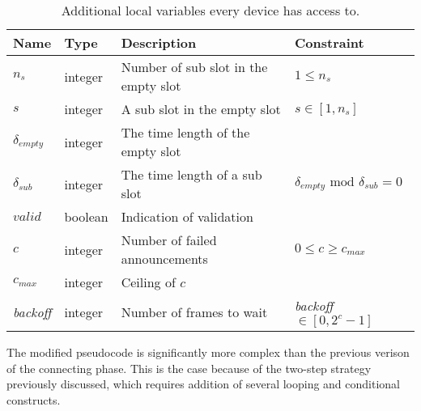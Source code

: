\begin{table}[h]
    {\setlength{\extrarowheight}{1ex}%
    \begin{tabularx}{\textwidth}{l|l|X|l}
        \toprule
        Name                & Type      & Description & Constraint \\
        \midrule
        $n_s$               & integer   & Number of sub slot in the empty slot  & $1 \leq n_s$      \\
        $s$                 & integer   & A sub slot in the empty slot          & $s \in [1, n_s]$  \\
        $\delta_{empty}$    & integer   & The time length of the empty slot     \\
        $\delta_{sub}$      & integer   & The time length of a sub slot         & $\delta_{empty} \text{ mod } \delta_{sub} = 0$ \\
        $valid$             & boolean   & Indication of validation              \\
        $c$                 & integer   & Number of failed announcements        & $0 \leq c \geq c_{max}$ \\
        $c_{max}$           & integer   & Ceiling of $c$                        \\
        \emph{backoff}      & integer   & Number of frames to wait              & \emph{backoff}$ \in [0, 2^c-1]$ \\
        \bottomrule
    \end{tabularx}}
    \caption{Additional local variables every device has access to.}
    \label{tab:locals_wmulticonnect}
\end{table}

The modified pseudocode is significantly more complex than the previous verison of the connecting phase.
This is the case because of the two-step strategy previously discussed, which requires addition of several looping and conditional constructs.